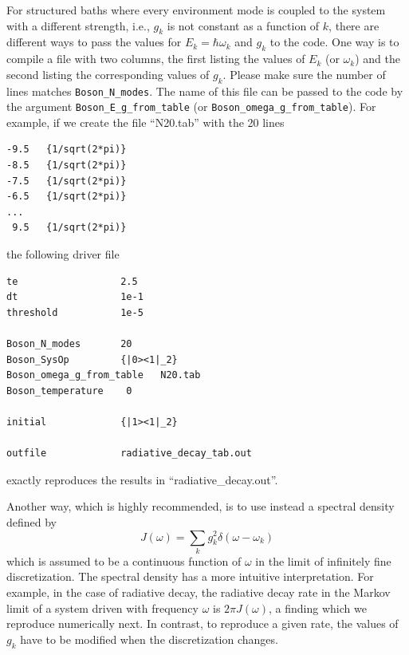 \documentclass{scrartcl}
\begin{document}
For structured baths where every environment mode is coupled to the system
with a different strength, i.e., $g_k$ is not constant as a function of $k$,
there are different ways to pass the values for $E_k=\hbar\omega_k$ and
$g_k$ to the code. One way is to compile a file with two columns, the first
listing the values of $E_k$ (or $\omega_k$) and the second listing 
the corresponding values of $g_k$. Please make sure the number of lines
matches \verb+Boson_N_modes+. The name of this file can be passed to the 
code by the argument \verb+Boson_E_g_from_table+ 
(or \verb+Boson_omega_g_from_table+). 
For example, if we create the file ``N20.tab'' with the 20 lines
\begin{verbatim}
-9.5   {1/sqrt(2*pi)}
-8.5   {1/sqrt(2*pi)}
-7.5   {1/sqrt(2*pi)}
-6.5   {1/sqrt(2*pi)}
...
 9.5   {1/sqrt(2*pi)}
\end{verbatim}
the following driver file
\begin{verbatim}
te                  2.5  
dt                  1e-1  
threshold           1e-5  
 
Boson_N_modes       20  
Boson_SysOp         {|0><1|_2}  
Boson_omega_g_from_table   N20.tab 
Boson_temperature    0  
 
initial             {|1><1|_2}  
 
outfile             radiative_decay_tab.out 
\end{verbatim}
exactly reproduces the results in ``radiative\_decay.out''.

Another way, which is highly recommended, is to use instead a spectral density
defined by
\begin{equation}
J(\omega)=\sum_k g_k^2 \delta(\omega-\omega_k)
\end{equation}
which is assumed to be a continuous function of $\omega$ 
in the limit of infinitely fine discretization. 
The spectral density has a more intuitive interpretation. For example, 
in the case of radiative decay, the radiative decay rate in the Markov
limit of a system driven with frequency $\omega$ is $2\pi J(\omega)$, 
a finding which we reproduce numerically next. 
In contrast, to reproduce a given rate, the values of $g_k$ have to be modified
when the discretization changes.
\end{document}
